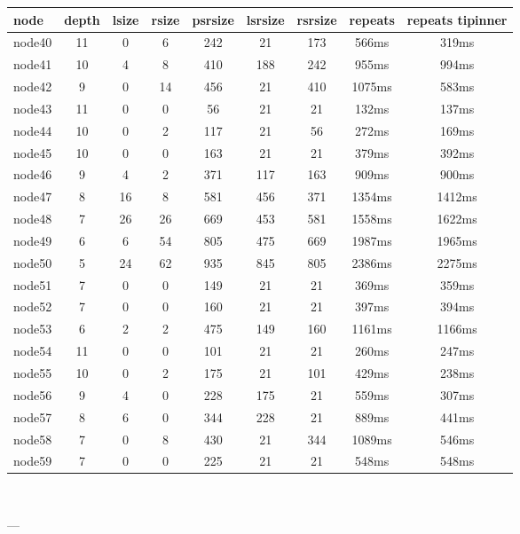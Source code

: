 \begin{tabular}{|l|c|c|c|c|c|c|c|c|}
\hline node & depth & lsize & rsize & psrsize & lsrsize & rsrsize   & repeats & repeats tipinner\\
    \hline node40 & 11 & 0 & 6 & 242 & 21 & 173 & 566ms & 319ms\\
    \hline node41 & 10 & 4 & 8 & 410 & 188 & 242 & 955ms & 994ms\\
    \hline node42 & 9 & 0 & 14 & 456 & 21 & 410 & 1075ms & 583ms\\
    \hline node43 & 11 & 0 & 0 & 56 & 21 & 21 & 132ms & 137ms\\
    \hline node44 & 10 & 0 & 2 & 117 & 21 & 56 & 272ms & 169ms\\
    \hline node45 & 10 & 0 & 0 & 163 & 21 & 21 & 379ms & 392ms\\
    \hline node46 & 9 & 4 & 2 & 371 & 117 & 163 & 909ms & 900ms\\
    \hline node47 & 8 & 16 & 8 & 581 & 456 & 371 & 1354ms & 1412ms\\
    \hline node48 & 7 & 26 & 26 & 669 & 453 & 581 & 1558ms & 1622ms\\
    \hline node49 & 6 & 6 & 54 & 805 & 475 & 669 & 1987ms & 1965ms\\
    \hline node50 & 5 & 24 & 62 & 935 & 845 & 805 & 2386ms & 2275ms\\
    \hline node51 & 7 & 0 & 0 & 149 & 21 & 21 & 369ms & 359ms\\
    \hline node52 & 7 & 0 & 0 & 160 & 21 & 21 & 397ms & 394ms\\
    \hline node53 & 6 & 2 & 2 & 475 & 149 & 160 & 1161ms & 1166ms\\
    \hline node54 & 11 & 0 & 0 & 101 & 21 & 21 & 260ms & 247ms\\
    \hline node55 & 10 & 0 & 2 & 175 & 21 & 101 & 429ms & 238ms\\
    \hline node56 & 9 & 4 & 0 & 228 & 175 & 21 & 559ms & 307ms\\
    \hline node57 & 8 & 6 & 0 & 344 & 228 & 21 & 889ms & 441ms\\
    \hline node58 & 7 & 0 & 8 & 430 & 21 & 344 & 1089ms & 546ms\\
    \hline node59 & 7 & 0 & 0 & 225 & 21 & 21 & 548ms & 548ms\\

\hline
\end{tabular} \

---


